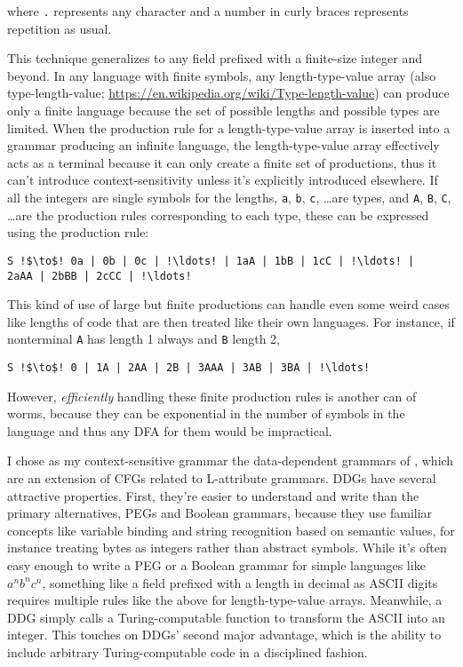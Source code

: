 \documentclass[12pt]{article}
\begin{document}
where \texttt{.} represents any character and a number in curly braces
represents repetition as usual.

This technique generalizes to any field prefixed with a finite-size
integer and beyond.  In any language with finite symbols, any
length-type-value array (also type-length-value;
\url{https://en.wikipedia.org/wiki/Type-length-value}) can produce
only a finite language because the set of possible lengths and
possible types are limited.  When the production rule for a
length-type-value array is inserted into a grammar producing an
infinite language, the length-type-value array effectively acts as a
terminal because it can only create a finite set of productions, thus
it can't introduce context-sensitivity unless it's explicitly
introduced elsewhere.  If all the integers are single symbols for the
lengths, \texttt{a}, \texttt{b}, \texttt{c}, \ldots are types, and
\texttt{A}, \texttt{B}, \texttt{C}, \ldots are the production rules
corresponding to each type, these can be expressed using the
production rule:

\begin{lstlisting}
S !$\to$! 0a | 0b | 0c | !\ldots! | 1aA | 1bB | 1cC | !\ldots! |
2aAA | 2bBB | 2cCC | !\ldots!
\end{lstlisting}

This kind of use of large but finite productions can handle even some
weird cases like lengths of code that are then treated like their own
languages.  For instance, if nonterminal \texttt{A} has length 1
always and \texttt{B} length 2,

\begin{lstlisting}
S !$\to$! 0 | 1A | 2AA | 2B | 3AAA | 3AB | 3BA | !\ldots!
\end{lstlisting}

However, \emph{efficiently} handling these finite production rules is
another can of worms, because they can be exponential in the number of
symbols in the language and thus any DFA for them would be
impractical.

I chose as my context-sensitive grammar the data-dependent grammars of
\textcite{yakker1}, which are an extension of CFGs related to
L-attribute grammars.  DDGs have several attractive properties.
First, they're easier to understand and write than the primary
alternatives, PEGs and Boolean grammars, because they use familiar
concepts like variable binding and string recognition based on
semantic values, for instance treating bytes as integers rather than
abstract symbols.  While it's often easy enough to write a PEG or a
Boolean grammar for simple languages like $a^nb^nc^n$, something like
a field prefixed with a length in decimal as ASCII digits requires
multiple rules like the above for length-type-value arrays.
Meanwhile, a DDG simply calls a Turing-computable function to
transform the ASCII into an integer.  This touches on DDGs' second
major advantage, which is the ability to include arbitrary
Turing-computable code in a disciplined fashion.
\end{document}
